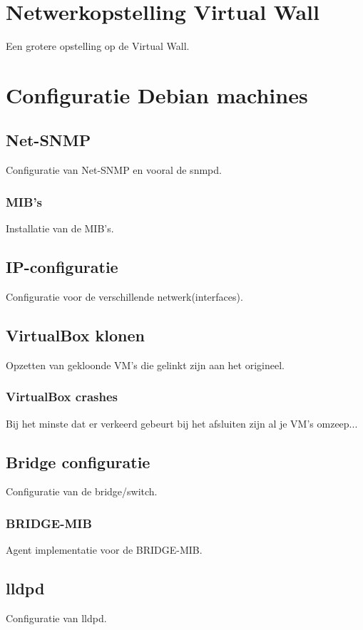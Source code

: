 \section{Netwerkopstelling Virtual Wall}
Een grotere opstelling op de Virtual Wall.


\section{Configuratie Debian machines}

\subsection{Net-SNMP}
Configuratie van Net-SNMP en vooral de snmpd.

\subsubsection{MIB's}
Installatie van de MIB's.

\subsection{IP-configuratie}
Configuratie voor de verschillende netwerk(interfaces).

\subsection{VirtualBox klonen}
Opzetten van gekloonde VM's die gelinkt zijn aan het origineel.

\subsubsection{VirtualBox crashes}
Bij het minste dat er verkeerd gebeurt bij het afsluiten zijn al je VM's omzeep...

\subsection{Bridge configuratie}
Configuratie van de bridge/switch.

\subsubsection{BRIDGE-MIB}
Agent implementatie voor de BRIDGE-MIB.

\subsection{lldpd}
Configuratie van lldpd.

